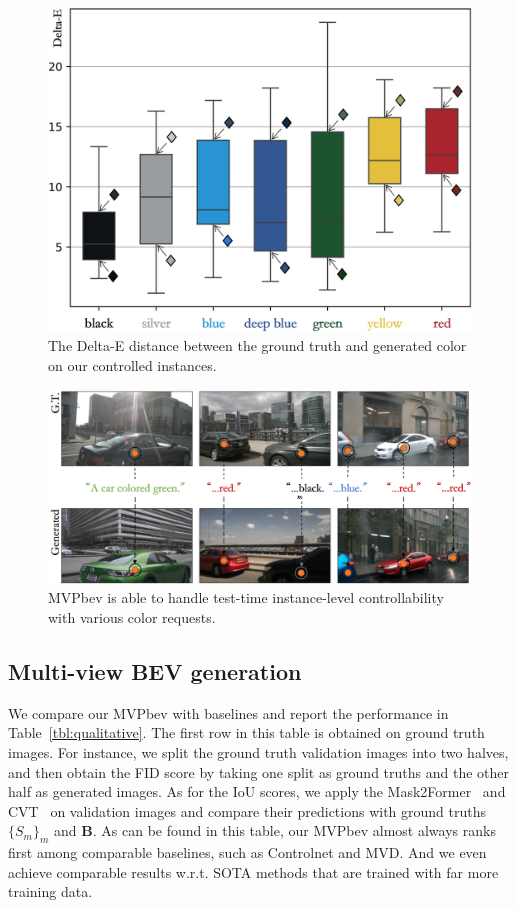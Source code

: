 \begin{figure}[h]
\centering
\includegraphics[width=0.9\linewidth]{figures/color_boxfig.png}
\caption{The Delta-E distance between the ground truth and generated color on our controlled instances.
}
\label{fig:obj_instance_eval}
\vspace{-2mm}
\end{figure}

\begin{figure}[b]
\centering
\includegraphics[width=0.9 \linewidth]{figures/mulit_obj_color_control_demo.png}
\caption{MVPbev is able to handle test-time instance-level controllability with various color requests.
}
\label{fig:obj_instance}
\end{figure}
\subsection{Multi-view BEV generation}
We compare our MVPbev with baselines and report the performance in Table~\ref{tbl:qualitative}. The first row in this table is obtained on ground truth images. For instance, we split the ground truth validation images into two halves, and then obtain the FID score by taking one split as ground truths and the other half as generated images. As for the IoU scores, we apply the Mask2Former~\cite{cheng2022masked} and CVT~\cite{zhou2022cross} on validation images and compare their predictions with ground truths $\{S_m\}_m$ and $\textbf{B}$. As can be found in this table, our MVPbev almost always ranks first among comparable baselines, such as Controlnet and MVD. And we even achieve comparable results w.r.t. SOTA methods that are trained with far more training data.

